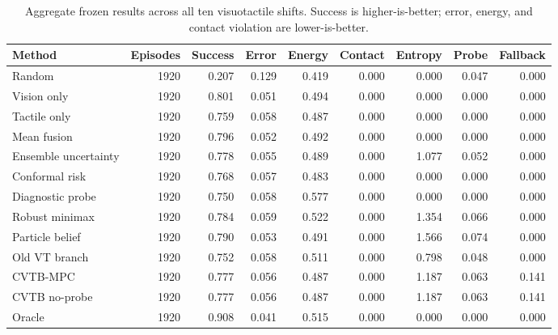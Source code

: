 \begin{table}[t]
\centering
\caption{Aggregate frozen results across all ten visuotactile shifts. Success is higher-is-better; error, energy, and contact violation are lower-is-better.}
\label{tab:aggregate-main}
\scriptsize
\begin{tabular}{lrrrrrrrr}
\toprule
Method & Episodes & Success & Error & Energy & Contact & Entropy & Probe & Fallback \\
\midrule
Random & 1920 & 0.207 & 0.129 & 0.419 & 0.000 & 0.000 & 0.047 & 0.000 \\
Vision only & 1920 & 0.801 & 0.051 & 0.494 & 0.000 & 0.000 & 0.000 & 0.000 \\
Tactile only & 1920 & 0.759 & 0.058 & 0.487 & 0.000 & 0.000 & 0.000 & 0.000 \\
Mean fusion & 1920 & 0.796 & 0.052 & 0.492 & 0.000 & 0.000 & 0.000 & 0.000 \\
Ensemble uncertainty & 1920 & 0.778 & 0.055 & 0.489 & 0.000 & 1.077 & 0.052 & 0.000 \\
Conformal risk & 1920 & 0.768 & 0.057 & 0.483 & 0.000 & 0.000 & 0.000 & 0.000 \\
Diagnostic probe & 1920 & 0.750 & 0.058 & 0.577 & 0.000 & 0.000 & 0.000 & 0.000 \\
Robust minimax & 1920 & 0.784 & 0.059 & 0.522 & 0.000 & 1.354 & 0.066 & 0.000 \\
Particle belief & 1920 & 0.790 & 0.053 & 0.491 & 0.000 & 1.566 & 0.074 & 0.000 \\
Old VT branch & 1920 & 0.752 & 0.058 & 0.511 & 0.000 & 0.798 & 0.048 & 0.000 \\
CVTB-MPC & 1920 & 0.777 & 0.056 & 0.487 & 0.000 & 1.187 & 0.063 & 0.141 \\
CVTB no-probe & 1920 & 0.777 & 0.056 & 0.487 & 0.000 & 1.187 & 0.063 & 0.141 \\
Oracle & 1920 & 0.908 & 0.041 & 0.515 & 0.000 & 0.000 & 0.000 & 0.000 \\
\bottomrule
\end{tabular}
\end{table}
